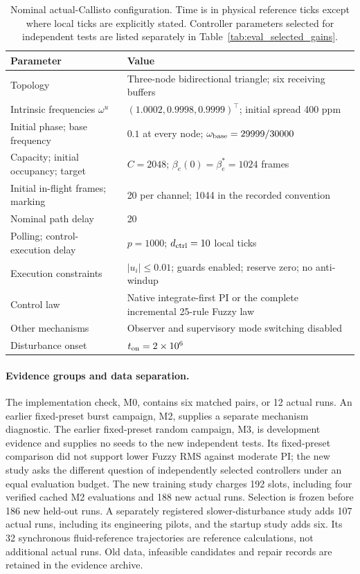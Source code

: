 \begin{table}[t]
\caption{Nominal actual-Callisto configuration. Time is in physical reference
ticks except where local ticks are explicitly stated. Controller parameters
selected for independent tests are listed separately in
Table~\ref{tab:eval_selected_gains}.}
\label{tab:eval_setup}
\centering
\begin{tabular}{@{}ll@{}}\toprule
Parameter & Value\\\midrule
Topology & Three-node bidirectional triangle; six receiving buffers\\
Intrinsic frequencies $\omega^u$ & $(1.0002,0.9998,0.9999)^\top$; initial spread 400 ppm\\
Initial phase; base frequency & $0.1$ at every node; $\omega_{\rm base}=29999/30000$\\
Capacity; initial occupancy; target & $C=2048$; $\beta_e(0)=\beta_e^*=1024$ frames\\
Initial in-flight frames; marking & 20 per channel; 1044 in the recorded convention\\
Nominal path delay & 20\\
Polling; control-execution delay & $p=1000$; $d_{\rm ctrl}=10$ local ticks\\
Execution constraints & $|u_i|\le0.01$; guards enabled; reserve zero; no anti-windup\\
Control law & Native integrate-first PI or the complete incremental 25-rule Fuzzy law\\
Other mechanisms & Observer and supervisory mode switching disabled\\
Disturbance onset & $t_{\rm on}=2\times10^6$\\\bottomrule
\end{tabular}
\end{table}

\paragraph{Evidence groups and data separation.}
The implementation check, M0, contains six matched pairs, or 12 actual
runs. An earlier fixed-preset burst campaign, M2, supplies a separate
mechanism diagnostic. The earlier fixed-preset random campaign, M3, is
development evidence and supplies no seeds to the new independent tests.
Its fixed-preset comparison did not support lower Fuzzy RMS against
moderate PI; the new study asks the different question of independently
selected controllers under an equal evaluation budget.
The new training study charges 192 slots, including four verified cached
M2 evaluations and 188 new actual runs. Selection is frozen before 186
new held-out runs. A separately registered slower-disturbance study adds
107 actual runs, including its engineering pilots, and the startup
study adds six. Its 32 synchronous fluid-reference trajectories are
reference calculations, not additional actual runs. Old data, infeasible
candidates and repair records are retained in the evidence archive.

